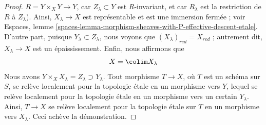 \begin{proof}
$R = Y \times_X Y \to Y$, car $Z_\lambda \subset Y$ est $R$-invariant,
et car $R_\lambda$ est la restriction de $R$ à $Z_\lambda$).
Ainsi, $X_\lambda \to X$ est représentable et est une immersion fermée ; voir
Espaces, lemme
\ref{spaces-lemma-morphism-sheaves-with-P-effective-descent-etale}.
D'autre part, puisque $Y_\lambda \subset Z_\lambda$, nous voyons que
$(X_\lambda)_{red} = X_{red}$ ; autrement dit, $X_\lambda \to X$
est un épaississement. Enfin, nous affirmons que
$$
X = \colim X_\lambda
$$
Nous avons $Y \times_X X_\lambda = Z_\lambda \supset Y_\lambda$. Tout
morphisme $T \to X$, où $T$ est un schéma sur $S$, se relève localement pour la topologie étale
en un morphisme vers $Y$, lequel se relève localement pour la topologie étale en un morphisme
vers un certain $Y_\lambda$. Ainsi, $T \to X$ se relève localement pour la topologie étale sur
$T$ en un morphisme vers $X_\lambda$. Ceci achève la démonstration.
\end{proof}

